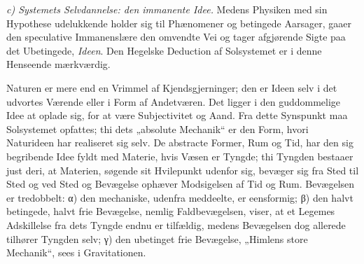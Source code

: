 \documentclass[12pt,a4paper]{book}
\newcommand{\runin}[1]{\emph{#1}\hspace{0.4em}}
\begin{document}
\runin{c) Systemets Selvdannelse: den immanente Idee.} Medens Physiken med sin Hypothese udelukkende holder sig til Phænomener
og betingede Aarsager, gaaer den speculative Immanenslære den omvendte
Vei og tager afgjørende Sigte paa det Ubetingede,
\emph{Ideen}. Den Hegelske Deduction af Solsystemet er i denne
Henseende mærkværdig.

Naturen er mere end en Vrimmel af Kjendsgjerninger; den er Ideen selv i
det udvortes Værende eller i Form af Andetværen. Det ligger i den
guddommelige Idee at oplade sig, for at være Subjectivitet og Aand. Fra
dette Synspunkt maa Solsystemet opfattes; thi dets „absolute Mechanik“
er den Form, hvori Naturideen har realiseret sig selv. De abstracte
Former, Rum og Tid, har den sig begribende Idee
fyldt med Materie, hvis Væsen er Tyngde; thi Tyngden bestaaer just deri, at
Materien, søgende sit Hvilepunkt udenfor sig, bevæger sig fra Sted til Sted og
ved Sted og Bevægelse ophæver Modsigelsen af Tid og Rum. Bevægelsen er
tredobbelt: α) den mechaniske, udenfra meddeelte, er eensformig; β) den halvt
betingede, halvt frie Bevægelse, nemlig Faldbevægelsen, viser, at et Legemes
Adskillelse fra dets Tyngde endnu er tilfældig, medens Bevægelsen dog allerede
tilhører Tyngden selv; γ) den ubetinget frie Bevægelse, „Himlens store
Mechanik“, sees i Gravitationen.
\end{document}
